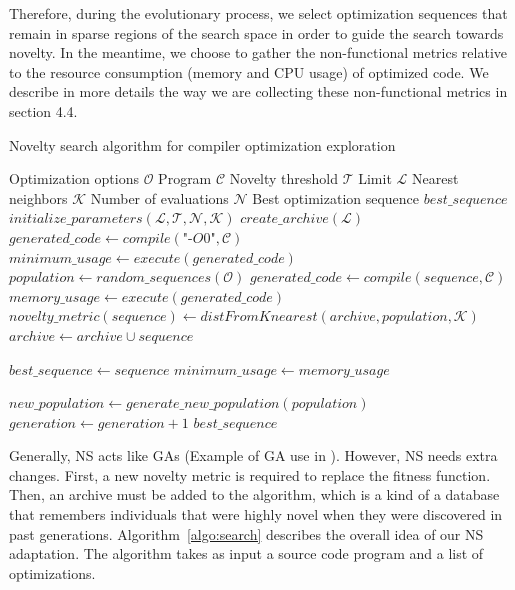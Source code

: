 Therefore, during the evolutionary process, we select optimization sequences that remain in sparse regions of the search space in order to guide the search towards novelty. 
In the meantime, we choose to gather the non-functional metrics relative to the resource consumption (memory and CPU usage) of optimized code. 
We describe in more details the way we are collecting these non-functional metrics in section 4.4.

\begin{algorithm}
	\footnotesize
	\caption{Novelty search algorithm for compiler optimization exploration}
	\label{algo:search}
	\begin{algorithmic}[1]
		
		\REQUIRE Optimization options $\mathcal{O}$
		\REQUIRE Program $\mathcal{C}$
		\REQUIRE Novelty threshold $\mathcal{T}$
		\REQUIRE Limit $\mathcal{L}$
		\REQUIRE Nearest neighbors $\mathcal{K}$
		\REQUIRE Number of evaluations $\mathcal{N}$
		\ENSURE Best optimization sequence $best\_sequence$
		\STATE $initialize\_parameters(\mathcal{L},\mathcal{T},\mathcal{N},\mathcal{K})$
		\STATE $create\_archive(\mathcal{L})$
		\STATE 	$generated\_code \gets compile(\textit{"-O0"},\mathcal{C})$
		\STATE 	$minimum\_usage \gets execute(generated\_code)$
		\STATE $population \gets random\_sequences(\mathcal{O})$
		\REPEAT
		\STATE 	$generated\_code \gets compile(sequence,\mathcal{C})$
		\STATE 	$memory\_usage \gets execute(generated\_code)$
		\STATE	$novelty\_metric(sequence) \gets distFromKnearest(archive,population,\mathcal{K})$
		\STATE	$archive \gets archive \cup sequence$
		\ENDIF
		
		\STATE	$best\_sequence \gets sequence$
		\STATE	$minimum\_usage \gets memory\_usage$
		\ENDIF
		
		\ENDFOR
		\STATE		$new\_population \gets generate\_new\_population(population)$
		\STATE		$generation \gets generation + 1$
		\RETURN $best\_sequence$
	\end{algorithmic}
\end{algorithm}

Generally, NS acts like GAs (Example of GA use in  \cite{cooper2002adaptive}). However, NS needs extra changes. First, a new novelty metric is required to replace the fitness function. Then, an archive must be added to the algorithm, which is a kind of a database that remembers individuals that were highly novel when they were discovered in past generations. 
Algorithm~\ref{algo:search} describes the overall idea of our NS adaptation. The algorithm takes as input a source code program and a list of optimizations. 

